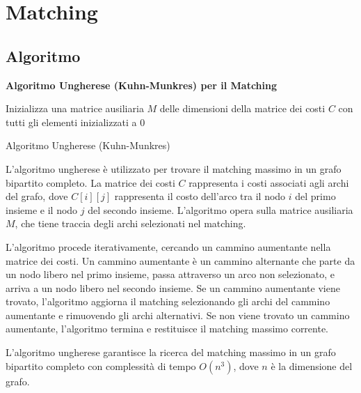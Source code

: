 
\chapter{Matching}

\section{Algoritmo}


\textbf{Algoritmo Ungherese (Kuhn-Munkres) per il Matching}

\begin{algorithm}[H]
\SetAlgoLined
{}

Inizializza una matrice ausiliaria $M$ delle dimensioni della matrice dei costi $C$ con tutti gli elementi inizializzati a $0$\;


\;
\caption{Algoritmo Ungherese (Kuhn-Munkres)}
\end{algorithm}

L'algoritmo ungherese è utilizzato per trovare il matching massimo in un grafo bipartito completo. La matrice dei costi $C$ rappresenta i costi associati agli archi del grafo, dove $C[i][j]$ rappresenta il costo dell'arco tra il nodo $i$ del primo insieme e il nodo $j$ del secondo insieme. L'algoritmo opera sulla matrice ausiliaria $M$, che tiene traccia degli archi selezionati nel matching.

L'algoritmo procede iterativamente, cercando un cammino aumentante nella matrice dei costi. Un cammino aumentante è un cammino alternante che parte da un nodo libero nel primo insieme, passa attraverso un arco non selezionato, e arriva a un nodo libero nel secondo insieme. Se un cammino aumentante viene trovato, l'algoritmo aggiorna il matching selezionando gli archi del cammino aumentante e rimuovendo gli archi alternativi. Se non viene trovato un cammino aumentante, l'algoritmo termina e restituisce il matching massimo corrente.

L'algoritmo ungherese garantisce la ricerca del matching massimo in un grafo bipartito completo con complessità di tempo $O(n^3)$, dove $n$ è la dimensione del grafo.

